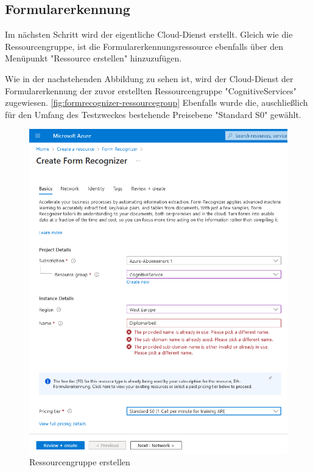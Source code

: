 \subsection{Formularerkennung}
Im nächsten Schritt wird der eigentliche Cloud-Dienst erstellt. Gleich wie die Ressourcengruppe, ist die Formularerkennungsressource ebenfalls über 
den Menüpunkt "Ressource erstellen" hinzuzufügen.

Wie in der nachstehenden Abbildung zu sehen ist, wird der Cloud-Dienst der Formularerkennung der zuvor erstellten Ressourcengruppe "CognitiveServices"
zugewiesen. \ref{fig:formrecognizer-ressourcegroup}
Ebenfalls wurde die, auschließlich für den Umfang des Testzweckes bestehende Preisebene "Standard S0" gewählt.


\begin{figure}[h]
    \centering
    \includegraphics[scale=0.6]{sections/cloud-computing/images/formrecognizer.png}
    \caption{Ressourcengruppe erstellen}
    \label{fig:kimldl-comparison}
\end{figure}

